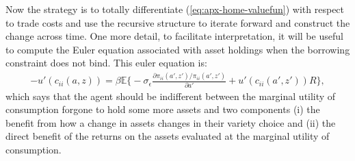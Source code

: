 \documentclass[12pt,pdftex]{article}
\begin{document}
\begin{onehalfspacing}
Now the strategy is to totally differentiate (\ref{eq:apx-home-valuefun}) with respect to trade costs and use the recursive structure to iterate forward and construct the change across time.  One more detail, to facilitate interpretation, it will be useful to compute the Euler equation associated with asset holdings when the borrowing constraint does not bind. This euler equation is:
\begin{align}
-u'(c_{ii}(a,z)) = \beta \mathbb{E} \bigg \{ -\sigma_{\epsilon} \frac{\partial \pi_{ii}(a',z') / \pi_{ii}(a',z')}{\partial a'} + u'(c_{ii}(a',z'))R \bigg \},
\label{eq:apx-euler-equation}
\end{align}
which says that the agent should be indifferent between the marginal utility of consumption forgone to hold some more assets and two components (i) the benefit from how a change in assets changes in their variety choice and (ii) the direct benefit of the returns on the assets evaluated at the marginal utility of consumption.

%
%


\end{onehalfspacing}
\end{document}

